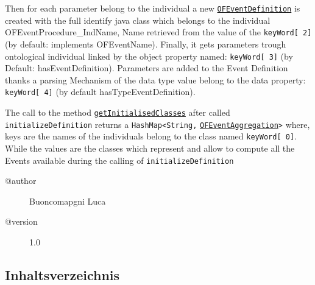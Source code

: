  Then for each parameter belong to the individual a new 
 \texttt{\hyperlink{ontologyFramework.OFEventManagement.OFLogicalEventManagement.OFEventDefinition-class}{OFEventDefinition}} is created with the full identify java class which belongs to the individual 
 \textquotedbl OFEventProcedure\_IndName\textquotedbl , Name retrieved from the value of the \verb!keyWord[ 2]!(by default: implements OFEventName).  
 Finally, it gets parameters trough ontological individual linked by the object property named: \verb!keyWord[ 3]! 
 (by Default: \textquotedbl hasEventDefinition\textquotedbl ). Parameters are  added to the Event Definition thanks a parsing 
 Mechanism of the data type value belong to the data property: \verb!keyWord[ 4]! 
 (by default \textquotedbl hasTypeEventDefinition\textquotedbl ).   
 \par 
 The call to the method \texttt{\hyperlink{ontologyFramework.OFEventManagement.OFLogicalEventManagement.OFEventBuilder.getInitialisedClasses()}{getInitialisedClasses}} after called \texttt{initializeDefinition}
 returns a \verb!HashMap<String,! \texttt{\hyperlink{ontologyFramework.OFEventManagement.OFLogicalEventManagement.OFEventAggregation-class}{OFEventAggregation}}\verb!>! where, keys are the names of the individuals
 belong to the class named \verb!keyWord[ 0]!. While the values are the classes which represent and
 allow to compute all the Events available during the calling of \texttt{initializeDefinition}
\begin{description}
\item[@author] 
Buoncomapgni Luca
\item[@version] 
1.0
\end{description}
\subsection{Inhaltsverzeichnis}
